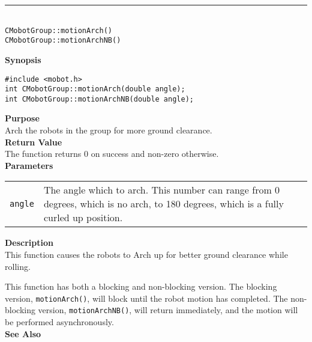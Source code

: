 \noindent
\vspace{5pt}
\rule{4.5in}{0.015in}\\
\noindent
{\LARGE \texttt{CMobotGroup::motionArch()}}\\
{\LARGE \texttt{CMobotGroup::motionArchNB()}}\\
{}

\noindent
{\bf Synopsis}
\vspace{-8pt}
\begin{verbatim}
#include <mobot.h>
int CMobotGroup::motionArch(double angle);
int CMobotGroup::motionArchNB(double angle);
\end{verbatim}

\noindent
{\bf Purpose}\\
Arch the robots in the group for more ground clearance.\\

\noindent
{\bf Return Value}\\
The function returns 0 on success and non-zero otherwise.\\

\noindent
{\bf Parameters}\\
\vspace{-0.1in}
\begin{description}
\item               
\begin{tabular}{p{10 mm}p{145 mm}}
\texttt{angle} & The angle which to arch. This number can range from 0 degrees, which is
no arch, to 180 degrees, which is a fully curled up position.\\
\end{tabular}
\end{description}

\noindent
{\bf Description}\\
This function causes the robots to Arch up for better ground clearance while 
rolling.

This function has both a blocking and non-blocking version.
The blocking version, \texttt{motionArch()}, will block until the
robot motion has completed. The non-blocking version, \texttt{motionArchNB()},
will return immediately, and the motion will be performed asynchronously.\\

\noindent
{\bf See Also}\\

